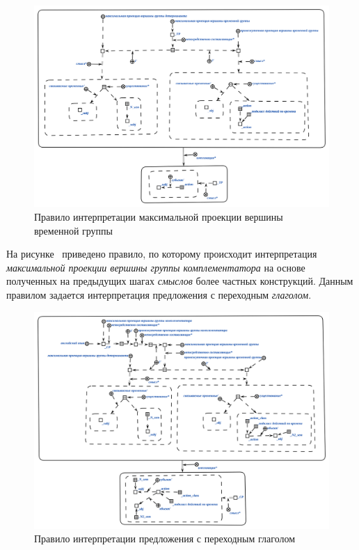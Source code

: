\begin{figure}[h]
    \centering
    \includegraphics[scale=0.8]{images/part2/chapter_lang/d_sem_6}
    \caption{Правило интерпретации максимальной проекции вершины временной группы}
    \label{fig:d_sem_6}
\end{figure}

На рисунке~\textit{} приведено правило, по которому происходит интерпретация \textit{максимальной проекции вершины группы комплементатора} на основе полученных на предыдущих шагах \textit{смыслов} более частных конструкций.
Данным правилом задается интерпретация предложения с переходным \textit{глаголом}.

\begin{figure}[h]
    \centering
    \includegraphics[scale=0.8]{images/part2/chapter_lang/d_sem_7}
    \caption{Правило интерпретации предложения с переходным глаголом}
    \label{fig:d_sem_7}
\end{figure}

%